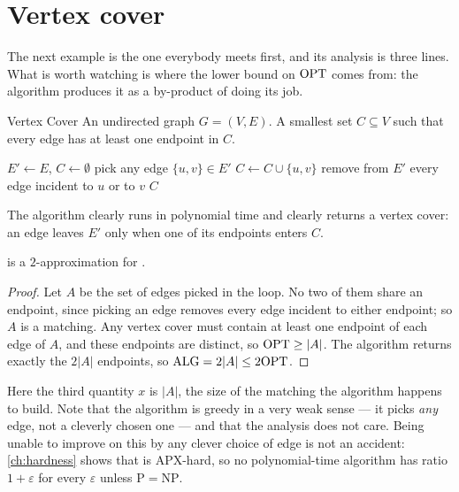 \section{Vertex cover}
\label{sec:vertex-cover-approx}

The next example is the one everybody meets first, and its analysis is three
lines. What is worth watching is where the lower bound on $\mathrm{OPT}$ comes from:
the algorithm produces it as a by-product of doing its job.

\begin{probdef}{Vertex Cover}
  \instance An undirected graph $G = (V,E)$.
  \question A smallest set $C \subseteq V$ such that every edge has at least
  one endpoint in $C$.
\end{probdef}

\begin{algorithm}[ht]
\caption{$2$-approximation for }
\label{alg:vertex-cover}
\begin{algorithmic}[1]
  \State $E' \gets E$, \quad $C \gets \emptyset$
    \State pick any edge $\{u,v\} \in E'$
    \State $C \gets C \cup \{u,v\}$
    \State remove from $E'$ every edge incident to $u$ or to $v$
  \EndWhile
  \State \Return $C$
\end{algorithmic}
\end{algorithm}

The algorithm clearly runs in polynomial time and clearly returns a vertex
cover: an edge leaves $E'$ only when one of its endpoints enters $C$.

\begin{theorem}\label{thm:vertex-cover-approx}
 is a $2$-approximation for .
\end{theorem}

\begin{proof}
Let $A$ be the set of edges picked in the loop. No two of them share an
endpoint, since picking an edge removes every edge incident to either endpoint;
so $A$ is a matching. Any vertex cover must contain at least one endpoint of
each edge of $A$, and these endpoints are distinct, so $\mathrm{OPT} \ge |A|$. The
algorithm returns exactly the $2|A|$ endpoints, so
$\mathrm{ALG} = 2|A| \le 2\mathrm{OPT}$.
\end{proof}

Here the third quantity $x$ is $|A|$, the size of the matching the algorithm
happens to build. Note that the algorithm is greedy in a very weak sense --- it
picks \emph{any} edge, not a cleverly chosen one --- and that the analysis does
not care. Being unable to improve on this by any clever choice of edge is not
an accident: \cref{ch:hardness} shows that  is
\textrm{APX}-hard, so no polynomial-time algorithm has ratio $1 + \varepsilon$
for every $\varepsilon$ unless $\mathrm{P} = \mathrm{NP}$.

